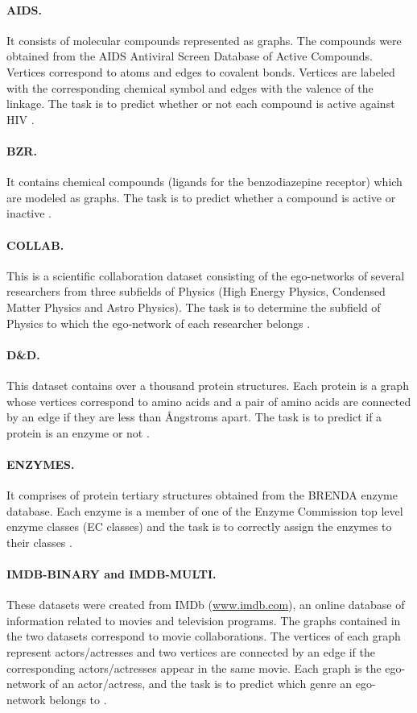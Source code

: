 \documentclass[twoside,11pt]{article}
\begin{document}
\paragraph{AIDS.} It consists of molecular compounds represented as graphs.
The compounds were obtained from the AIDS Antiviral Screen Database of Active Compounds.
Vertices correspond to atoms and edges to covalent bonds.
Vertices are labeled with the corresponding chemical symbol and edges with the valence of the linkage.
The task is to predict whether or not each compound is active against HIV .
\paragraph{BZR.} It contains  chemical compounds (ligands for the benzodiazepine receptor) which are modeled as graphs.
The task is to predict whether a compound is active or inactive .
\paragraph{COLLAB.} This is a scientific collaboration dataset consisting of the ego-networks of several researchers from three subfields of Physics (High Energy Physics, Condensed Matter Physics and Astro Physics).
The task is to determine the subfield of Physics to which the ego-network of each researcher belongs . 
\paragraph{D\&D.} This dataset contains over a thousand protein structures.
Each protein is a graph whose vertices correspond to amino acids and a pair of amino acids are connected by an edge if they are less than  \AA ngstroms apart.
The task is to predict if a protein is an enzyme or not .
\paragraph{ENZYMES.} It comprises of  protein tertiary structures obtained from the BRENDA enzyme database.
Each enzyme is a member of one of the Enzyme Commission top level enzyme classes (EC classes) and the task is to correctly assign the enzymes to their classes .
\paragraph{IMDB-BINARY and IMDB-MULTI.} These datasets were created from IMDb (\url{www.imdb.com}), an online database of information related to movies and television programs. 
The graphs contained in the two datasets correspond to movie collaborations.
The vertices of each graph represent actors/actresses and two vertices are connected by an edge if the corresponding actors/actresses appear in the same movie.
Each graph is the ego-network of an actor/actress, and the task is to predict which genre an ego-network belongs to .
\end{document}
